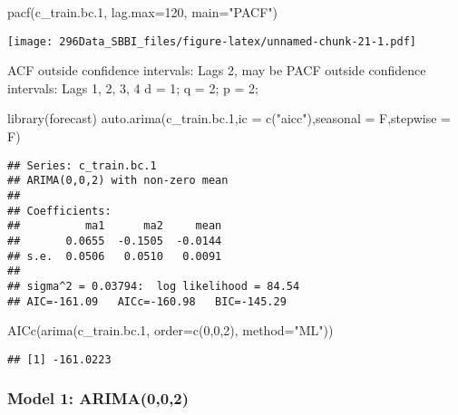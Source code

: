 \documentclass[
]{article}
\newenvironment{Shaded}{\begin{snugshade}}{\end{snugshade}}
\newcommand{\AttributeTok}[1]{\textcolor[rgb]{0.77,0.63,0.00}{#1}}
\newcommand{\DecValTok}[1]{\textcolor[rgb]{0.00,0.00,0.81}{#1}}
\newcommand{\FloatTok}[1]{\textcolor[rgb]{0.00,0.00,0.81}{#1}}
\newcommand{\FunctionTok}[1]{\textcolor[rgb]{0.00,0.00,0.00}{#1}}
\newcommand{\NormalTok}[1]{#1}
\newcommand{\StringTok}[1]{\textcolor[rgb]{0.31,0.60,0.02}{#1}}
\begin{document}
\begin{Shaded}
\begin{Highlighting}[]
\FunctionTok{pacf}\NormalTok{(c\_train.bc}\FloatTok{.1}\NormalTok{, }\AttributeTok{lag.max=}\DecValTok{120}\NormalTok{, }\AttributeTok{main=}\StringTok{"PACF"}\NormalTok{)}
\end{Highlighting}
\end{Shaded}

\texttt{[image: 296Data\_SBBI\_files/figure-latex/unnamed-chunk-21-1.pdf]}

ACF outside confidence intervals: Lags 2, may be PACF outside confidence
intervals: Lags 1, 2, 3, 4 d = 1; q = 2; p = 2;

\begin{Shaded}
\begin{Highlighting}[]
\FunctionTok{library}\NormalTok{(forecast)}
\FunctionTok{auto.arima}\NormalTok{(c\_train.bc}\FloatTok{.1}\NormalTok{,}\AttributeTok{ic =} \FunctionTok{c}\NormalTok{(}\StringTok{"aicc"}\NormalTok{),}\AttributeTok{seasonal =}\NormalTok{ F,}\AttributeTok{stepwise =}\NormalTok{ F)}
\end{Highlighting}
\end{Shaded}

\begin{verbatim}
## Series: c_train.bc.1 
## ARIMA(0,0,2) with non-zero mean 
## 
## Coefficients:
##          ma1      ma2     mean
##       0.0655  -0.1505  -0.0144
## s.e.  0.0506   0.0510   0.0091
## 
## sigma^2 = 0.03794:  log likelihood = 84.54
## AIC=-161.09   AICc=-160.98   BIC=-145.29
\end{verbatim}

\begin{Shaded}
\begin{Highlighting}[]
\FunctionTok{AICc}\NormalTok{(}\FunctionTok{arima}\NormalTok{(c\_train.bc}\FloatTok{.1}\NormalTok{, }\AttributeTok{order=}\FunctionTok{c}\NormalTok{(}\DecValTok{0}\NormalTok{,}\DecValTok{0}\NormalTok{,}\DecValTok{2}\NormalTok{), }\AttributeTok{method=}\StringTok{"ML"}\NormalTok{)) }
\end{Highlighting}
\end{Shaded}

\begin{verbatim}
## [1] -161.0223
\end{verbatim}

\hypertarget{model-1-arima002}{%
\subsubsection{Model 1: ARIMA(0,0,2)}\label{model-1-arima002}}
\end{document}
